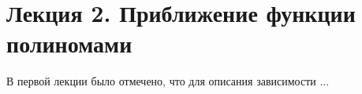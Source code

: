 \section{Лекция 2. Приближение функции полиномами}
В первой лекции было отмечено, что для описания зависимости ...
